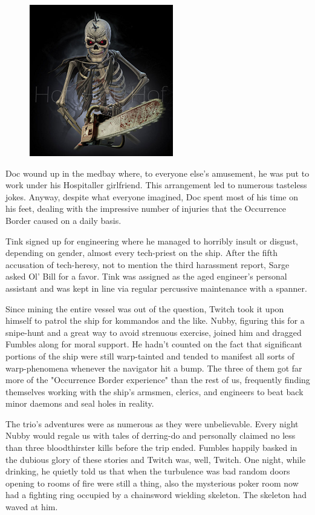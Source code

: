 \begin{figure}
	\begin{center}
		\includegraphics[width=\figwidth]{pics/10/10.png}
	\end{center}
\end{figure}
Doc wound up in the medbay where, to everyone else's amusement, he was put to work under his Hospitaller girlfriend. 
This arrangement led to numerous tasteless jokes. 
Anyway, despite what everyone imagined, Doc spent most of his time on his feet, dealing with the impressive number of injuries that the Occurrence Border caused on a daily basis.

Tink signed up for engineering where he managed to horribly insult or disgust, depending on gender, almost every tech-priest on the ship. 
After the fifth accusation of tech-heresy, not to mention the third harassment report, Sarge asked Ol' Bill for a favor. 
Tink was assigned as the aged engineer's personal assistant and was kept in line via regular percussive maintenance with a spanner.

Since mining the entire vessel was out of the question, Twitch took it upon himself to patrol the ship for kommandos and the like. 
Nubby, figuring this for a snipe-hunt and a great way to avoid strenuous exercise, joined him and dragged Fumbles along for moral support. 
He hadn't counted on the fact that significant portions of the ship were still warp-tainted and tended to manifest all sorts of warp-phenomena whenever the navigator hit a bump. 
The three of them got far more of the "Occurrence Border experience" than the rest of us, frequently finding themselves working with the ship's armsmen, clerics, and engineers to beat back minor daemons and seal holes in reality. 


The trio's adventures were as numerous as they were unbelievable. 
Every night Nubby would regale us with tales of derring-do and personally claimed no less than three bloodthirster kills before the trip ended. 
Fumbles happily basked in the dubious glory of these stories and Twitch was, well, Twitch. 
One night, while drinking, he quietly told us that when the turbulence was bad random doors opening to rooms of fire were still a thing, also the mysterious poker room now had a fighting ring occupied by a chainsword wielding skeleton. 
The skeleton had waved at him.

